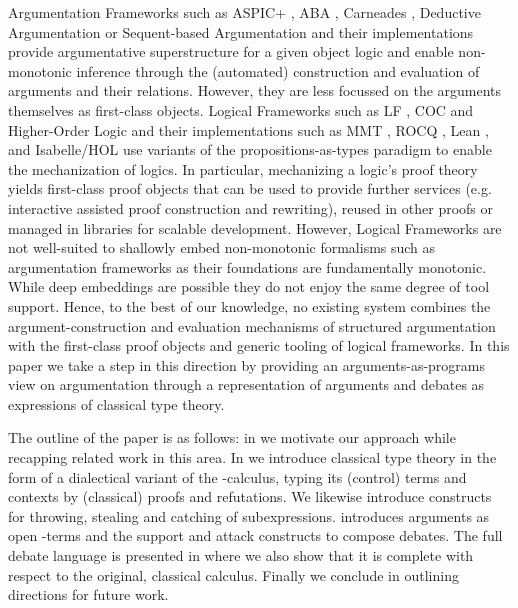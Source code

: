 \documentclass{IOS-Book-Article}
\begin{document}
Argumentation Frameworks such as ASPIC+ \cite{Prakken2010StructuredArguments} \cite{ModgilPrakken2014ASPICPlus}, ABA \cite{BondarenkoDungKowalskiToni1997DefaultReasoning}, Carneades \cite{GordonPrakkenWalton2007Carneades}, Deductive Argumentation \cite{BesnardHunter2001DeductiveArguments} or Sequent-based Argumentation \cite{ArieliStrasser2015SequentBasedLogicalArgumentation} and their implementations provide argumentative superstructure for a given object logic and enable non-monotonic inference through the (automated) construction and evaluation of arguments and their relations.
However, they are less focussed on the arguments themselves as first-class objects.
Logical Frameworks such as LF \cite{HarperHonsellPlotkin1993LF}, COC \cite{CoquandHuet1988CoC} and Higher-Order Logic \cite{Church1940SimpleTypes} and their implementations such as MMT \cite{KohlhaseRabe2013ScalableModuleSystem}, ROCQ \cite{BertotCasteran2004CoqArt}, Lean \cite{MouraKongAvigadDoornRaumer2015Lean}, and Isabelle/HOL \cite{NipkowPaulsonWenzel2002IsabelleHOL} use variants of the propositions-as-types paradigm to enable the mechanization of logics. In particular, mechanizing a logic's proof theory yields first-class proof objects that can be used to provide further services (e.g. interactive assisted proof construction and rewriting), reused in other proofs or managed in libraries for scalable development. However, Logical Frameworks are not well-suited to shallowly embed non-monotonic formalisms such as argumentation frameworks as their foundations are fundamentally monotonic. While deep embeddings are possible \cite{FuenmayorBenzmueller2020ClimateEngineering} they do not enjoy the same degree of tool support.
Hence, to the best of our knowledge, no existing system combines the argument-construction and evaluation mechanisms of structured argumentation with the first-class proof objects and generic tooling of logical frameworks.
In this paper we take a step in this direction by providing an arguments-as-programs view on argumentation through a representation of arguments and debates as expressions of classical type theory.

 The outline of the paper is as follows: in  we motivate our approach while recapping related work in this area. In  we introduce classical type theory in the form of a dialectical variant of the \matilda-calculus, typing its (control) terms and contexts by (classical) proofs and refutations. We likewise introduce constructs for throwing, stealing and catching of subexpressions.  introduces arguments as open \matilda-terms and the support and attack constructs to compose debates. The full debate language is presented in  where we also show that it is complete with respect to the original, classical calculus. Finally we conclude in  outlining directions for future work.
\end{document}

